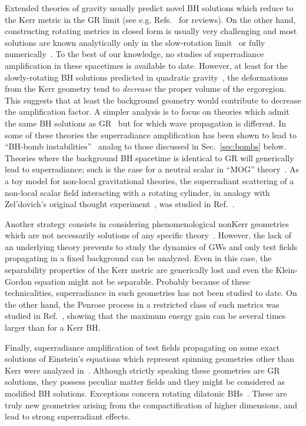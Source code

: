 \documentclass[11pt]{article}
\numberwithin{equation}{section} %
\begin{document}
Extended theories of gravity usually predict novel BH solutions which reduce to the Kerr metric in the GR limit (see 
e.g. Refs.~\cite{Yunes:2013dva,Barausse:2014tra,Berti:2015itd} for reviews). On the other hand, constructing rotating 
metrics in closed form is usually very challenging and most solutions are known analytically only in the slow-rotation 
limit~\cite{Pani:2011gy} or fully numerically~\cite{Kleihaus:2011tg}. To the best of our knowledge, no studies of 
superradiance amplification in these spacetimes is available to date. However, at least for the slowly-rotating BH 
solutions predicted in quadratic gravity~\cite{Pani:2011gy}, the deformations from the Kerr geometry tend to 
\emph{decrease} the proper volume of the ergoregion. This suggests that at least the background geometry would 
contribute to decrease the amplification factor. A simpler analysis is to focus on theories which admit the same BH 
solutions as GR~\cite{Psaltis:2007cw,Berti:2015itd} but for which wave propagation is different. In some of these 
theories the superradiance amplification has been shown to lead to ``BH-bomb 
instabilities''~\cite{Myung:2011we,Myung:2013oca} analog to those discussed in Sec.~\ref{sec:bombs} below. Theories 
where the background BH spacetime is identical to GR will generically lead to superradiance;
such is the case for a neutral scalar in ``MOG'' theory~\cite{Wondrak:2018fza}. As a toy model for non-local 
gravitational theories, the superradiant scattering of a non-local scalar field interacting with a rotating cylinder, in 
analogy with Zel'dovich's original thought experiment~\cite{zeldovich1,zeldovich2}, was studied 
in Ref.~\cite{Frolov:2018bak}.

Another strategy consists in considering phenomenological nonKerr geometries which are not necessarily solutions of any 
specific theory~\cite{Johannsen:2011dh,Cardoso:2014rha}. However, the lack of an underlying theory prevents to study the dynamics of GWs and only test fields propagating in a fixed background can be analyzed. Even in this case, the 
separability properties of the Kerr metric are generically lost and even the Klein-Gordon equation might not be 
separable. Probably because of these technicalities, superradiance in such geometries has not been studied to date. On 
the other hand, the Penrose process in a restricted class of such metrics was studied in Ref.~\cite{Liu:2012qe}, showing 
that the maximum energy gain can be several times larger than for a Kerr BH.

Finally, superradiance amplification of test fields propagating on some exact solutions of Einstein's equations which represent spinning geometries other than Kerr were analyzed in~\cite{Bini:2003sy,Bini:2014kga,Khodadi:2020cht}. Although strictly speaking these geometries are GR solutions, they possess peculiar matter fields and they might be considered as modified BH solutions. Exceptions concern rotating dilatonic BHs~\cite{Koga:1994np}. These are truly new geometries arising from the compactification of higher dimensions, and lead to strong superradiant effects.
\end{document}
